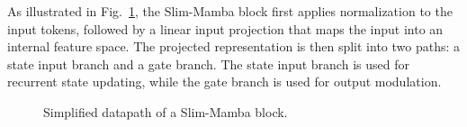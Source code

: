 \documentclass[11pt,twoside]{eitExjobb}
\begin{document}
\begin{table}[!htbp]
  \centering
  \caption{Comparison of localization accuracy and implementation cost across model variants.}
  \label{tab:model_variants}
\end{table}

\FloatBarrier

As illustrated in Fig.~\ref{fig:slim_mamba}, the Slim-Mamba block first applies
normalization to the input tokens, followed by a linear input projection that maps the
input into an internal feature space. The projected representation is then split into
two paths: a state input branch and a gate branch. The state input branch is used for
recurrent state updating, while the gate branch is used for output
modulation.


\begin{figure}[H]
  \centering
  
  \caption{Simplified datapath of a Slim-Mamba block.}
  \label{fig:slim_mamba}
\end{figure}

\FloatBarrier
\end{document}
